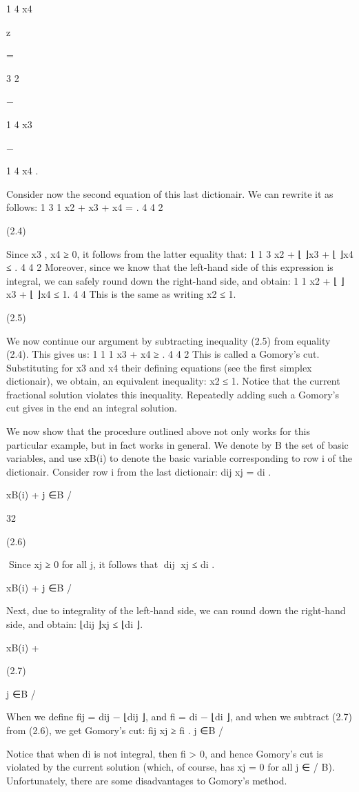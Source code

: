 \documentclass[titlepage]{book}
\theoremstyle{definition}
\begin{document}
1
4 x4

z

=

3
2

−

1
4 x3

−

1
4 x4 .

Consider now the second equation of this last dictionair. We can rewrite it as follows:
1
3
1
x2 + x3 + x4 = .
4
4
2

(2.4)

Since x3 , x4 ≥ 0, it follows from the latter equality that:
1
1
3
x2 + ⌊ ⌋x3 + ⌊ ⌋x4 ≤ .
4
4
2
Moreover, since we know that the left-hand side of this expression is integral, we can safely round down
the right-hand side, and obtain:
1
1
x2 + ⌊ ⌋x3 + ⌊ ⌋x4 ≤ 1.
4
4
This is the same as writing
x2 ≤ 1.

(2.5)

We now continue our argument by subtracting inequality (2.5) from equality (2.4). This gives us:
1
1
1
x3 + x4 ≥ .
4
4
2
This is called a Gomory's cut. Substituting for x3 and x4 their defining equations (see the first simplex
dictionair), we obtain, an equivalent inequality:
x2 ≤ 1.
Notice that the current fractional solution violates this inequality. Repeatedly adding such a Gomory's
cut gives in the end an integral solution.

We now show that the procedure outlined above not only works for this particular example, but in fact
works in general. We denote by B the set of basic variables, and use xB(i) to denote the basic variable
corresponding to row i of the dictionair. Consider row i from the last dictionair:
dij xj = di .

xB(i) +
j ∈B
/

32

(2.6)

Since xj ≥ 0 for all j, it follows that
⌊dij ⌋xj ≤ di .

xB(i) +
j ∈B
/

Next, due to integrality of the left-hand side, we can round down the right-hand side, and obtain:
⌊dij ⌋xj ≤ ⌊di ⌋.

xB(i) +

(2.7)

j ∈B
/

When we define fij = dij − ⌊dij ⌋, and fi = di − ⌊di ⌋, and when we subtract (2.7) from (2.6), we get
Gomory's cut:
fij xj ≥ fi .
j ∈B
/

Notice that when di is not integral, then fi > 0, and hence Gomory's cut is violated by the current
solution (which, of course, has xj = 0 for all j ∈
/ B).
Unfortunately, there are some disadvantages to Gomory's method.
\end{document}
